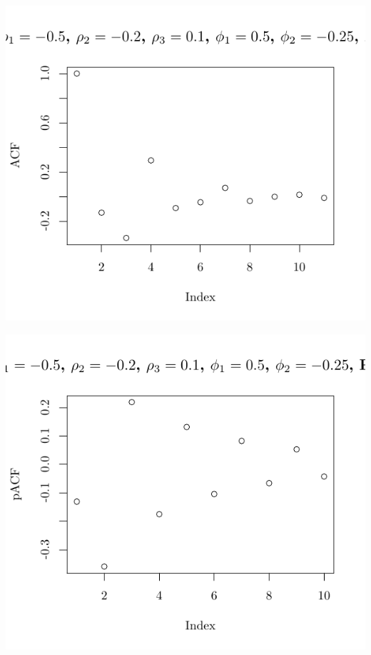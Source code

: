\documentclass[10pt]{paper}\usepackage[]{graphicx}\usepackage[]{color}
\makeatletter
\def\maxwidth{ %
  \ifdim\Gin@nat@width>\linewidth
    \linewidth
  \else
    \Gin@nat@width
  \fi
}
\newenvironment{knitrout}{}{} %
\makeatother
\begin{document}
\begin{knitrout}
{\centering \includegraphics[width=\maxwidth]{figure/graphics-plotter-157} 

}




{\centering \includegraphics[width=\maxwidth]{figure/graphics-plotter-158} 

}





\end{knitrout}
\end{document}
